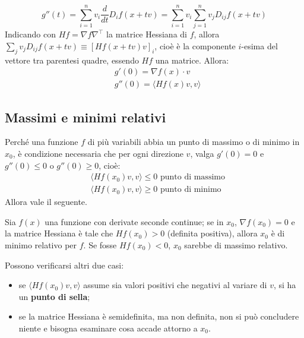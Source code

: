 \documentclass[11pt, a4paper]{scrartcl}
\theoremstyle{definition}
\numberwithin{esempio}{section}
\theoremstyle{definition}
\numberwithin{obs}{section}
\numberwithin{nota}{section}
\numberwithin{equation}{subsection}
\begin{document}
\begin{equation}
	g''(t)	= \sum_{i=1}^{n} v_i \frac{d }{d t} D_i f (x+tv) = \sum_{i=1}^{n} v_i \sum_{j=1}^{n} v_j D_{ij} f(x+tv)
\end{equation}
Indicando con $Hf = \nabla f \nabla ^\top$ la matrice Hessiana di $f$, allora $\sum_{j}^{} v_j D_{ij} f(x+tv) \equiv \left[ Hf(x+tv) v\right]_i $, cio\`e \`e la componente $i$-esima del vettore tra parentesi quadre, essendo $Hf$ una matrice. Allora:
\begin{equation}
	\begin{split}
		&g'(0) = \nabla f(x) \cdot v \\ 
		& g''(0) = \langle Hf(x) v , v \rangle
	\end{split}
\end{equation}
 
\subsection{Massimi e minimi relativi}

Perch\'e una funzione $f$ di pi\`u variabili abbia un punto di massimo o di minimo in $x_0$, \`e condizione necessaria che per ogni direzione $v$, valga $g'(0) = 0$ e $g''(0) \le 0$ o $g''(0) \ge 0$, cio\`e:
\begin{equation}
	\begin{split}
		&\langle Hf (x_0) v , v \rangle \le 0 \text{ punto di massimo}\\
		&\langle Hf (x_0) v , v \rangle \ge 0 \text{ punto di minimo}
	\end{split}
\end{equation}
Allora vale il seguente.
\begin{teorema}
	{}{}
	Sia $f(x)$ una funzione con derivate seconde continue; se in $x_0$, $\nabla f (x_0) = 0$ e la matrice Hessiana \`e tale che $Hf(x_0) > 0$ (definita positiva), allora $x_0$ \`e di minimo relativo per $f$. Se fosse $Hf(x_0) < 0$, $x_0$ sarebbe di massimo relativo.
\end{teorema}
\noindent Possono verificarsi altri due casi:
\begin{itemize}
	\item se $\langle H f(x_0)v ,v \rangle $ assume sia valori positivi che negativi al variare di $v$, si ha un \textbf{punto di sella};
	\item se la matrice Hessiana \`e semidefinita, ma non definita, non si pu\`o concludere niente e bisogna esaminare cosa accade attorno a $x_0$.
\end{itemize}
\end{document}
